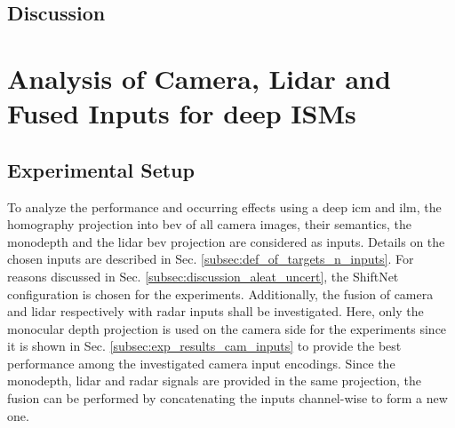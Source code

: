 \subsection{Discussion}
%
\section{Analysis of Camera, Lidar and Fused Inputs for deep ISMs}
\label{sec:cam_lidar_fusion_in_deep_isms}
%
\subsection{Experimental Setup}
\label{subsec:setup_cam_lidar_fusion_in_deep_isms}
To analyze the performance and occurring effects using a deep \gls{icm} and \gls{ilm}, the homography projection into \gls{bev} of all camera images, their semantics, the \gls{monodepth} and the lidar \gls{bev} projection are considered as inputs. Details on the chosen inputs are described in Sec. \ref{subsec:def_of_targets_n_inputs}. For reasons discussed in Sec. \ref{subsec:discussion_aleat_uncert}, the ShiftNet configuration is chosen for the experiments. Additionally, the fusion of camera and lidar respectively with radar inputs shall be investigated. Here, only the monocular depth projection is used on the camera side for the experiments since it is shown in Sec. \ref{subsec:exp_results_cam_inputs} to provide the best performance among the investigated camera input encodings. Since the \gls{monodepth}, lidar and radar signals are provided in the same projection, the fusion can be performed by concatenating the inputs channel-wise to form a new one.\\
%

